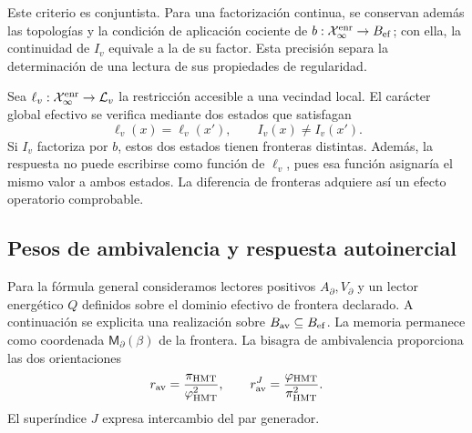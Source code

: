 Este criterio es conjuntista. Para una factorización continua, se
conservan además las topologías y la condición de aplicación cociente
de \(b:\mathcal X_\infty^{\rm enr}\to B_{\rm ef}\); con ella, la
continuidad de \(I_v\) equivale a la de su factor. Esta precisión
separa la determinación de una lectura de sus propiedades de regularidad.

Sea \(\ell_v:\mathcal X_\infty^{\rm enr}\to\mathcal L_v\) la
restricción accesible a una vecindad local. El carácter global efectivo
se verifica mediante dos estados que satisfagan
\begin{equation}
 \ell_v(x)=\ell_v(x'),\qquad I_v(x)\neq I_v(x').
 \label{vii:eq:observador-testigo-global}
\end{equation}
Si \(I_v\) factoriza por \(b\), estos dos estados tienen fronteras
distintas. Además, la respuesta no puede escribirse como función de
\(\ell_v\), pues esa función asignaría el mismo valor a ambos estados.
La diferencia de fronteras adquiere así un efecto operatorio comprobable.

\subsection{Pesos de ambivalencia y respuesta autoinercial}
\label{vii:sec:observador-ambivalencia}

Para la fórmula general consideramos lectores positivos
\(A_\partial,V_\partial\) y un lector energético \(Q\)
definidos sobre el dominio efectivo de frontera declarado.
A continuación se explicita una realización sobre
\(B_{\rm av}\subseteq B_{\rm ef}\). La memoria permanece como coordenada
\(\mathsf M_\partial(\beta)\) de la frontera. La bisagra de
ambivalencia proporciona las dos orientaciones
\[
 r_{\rm av}=\frac{\pi_{\rm HMT}}{\varphi_{\rm HMT}^2},\qquad
 r_{\rm av}^{J}=\frac{\varphi_{\rm HMT}}{\pi_{\rm HMT}^2}.
\]
El superíndice \(J\) expresa intercambio del par generador.
